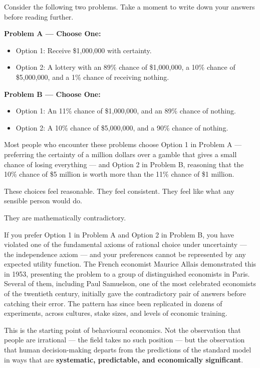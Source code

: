 \documentclass[12pt, letterpaper]{article}
\begin{document}
Consider the following two problems. Take a moment to write down your answers before reading further.

\medskip

\textbf{Problem A --- Choose One:}
\begin{itemize}
\item Option 1: Receive \$1,000,000 with certainty.
\item Option 2: A lottery with an 89\% chance of \$1,000,000, a 10\% chance of \$5,000,000, and a 1\% chance of receiving nothing.
\end{itemize}

\textbf{Problem B --- Choose One:}
\begin{itemize}
\item Option 1: An 11\% chance of \$1,000,000, and an 89\% chance of nothing.
\item Option 2: A 10\% chance of \$5,000,000, and a 90\% chance of nothing.
\end{itemize}

\medskip

Most people who encounter these problems choose Option 1 in Problem A --- preferring the certainty of a million dollars over a gamble that gives a small chance of losing everything --- and Option 2 in Problem B, reasoning that the 10\% chance of \$5 million is worth more than the 11\% chance of \$1 million.

These choices feel reasonable. They feel consistent. They feel like what any sensible person would do.

They are mathematically contradictory.

If you prefer Option 1 in Problem A and Option 2 in Problem B, you have violated one of the fundamental axioms of rational choice under uncertainty --- the independence axiom --- and your preferences cannot be represented by any expected utility function. The French economist Maurice Allais demonstrated this in 1953, presenting the problem to a group of distinguished economists in Paris. Several of them, including Paul Samuelson, one of the most celebrated economists of the twentieth century, initially gave the contradictory pair of answers before catching their error. The pattern has since been replicated in dozens of experiments, across cultures, stake sizes, and levels of economic training.

This is the starting point of behavioural economics. Not the observation that people are irrational --- the field takes no such position --- but the observation that human decision-making departs from the predictions of the standard model in ways that are \textbf{systematic, predictable, and economically significant}.
\end{document}
